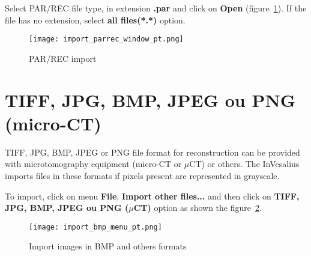 
Select PAR/REC file type, in extension \textbf{.par} and click on \textbf{Open} (figure~\ref{fig:import_parrec_window_pt}). If the file has no extension, select \textbf{all files(*.*)} option.

\begin{figure}[!htb]
\centering
\texttt{[image: import\_parrec\_window\_pt.png]}
\caption{PAR/REC import}
\label{fig:import_parrec_window_pt}
\end{figure}



\section{TIFF, JPG, BMP, JPEG ou PNG (micro-CT)}


TIFF, JPG, BMP, JPEG or PNG file format for reconstruction can be provided with microtomography equipment (micro-CT or $\mu$CT) or others. The InVesalius imports files in these formats if pixels present are represented in grayscale.



To import, click on menu \textbf{File}, \textbf{Import other files...} and then click on \textbf{TIFF, JPG, BMP, JPEG ou PNG ($\mu$CT)} option as shown the figure~\ref{fig:import_bmp_menu_pt}.

\begin{figure}[!htb]
\centering
\texttt{[image: import\_bmp\_menu\_pt.png]}
\caption{Import images in BMP and others formats}
\label{fig:import_bmp_menu_pt}
\end{figure}


